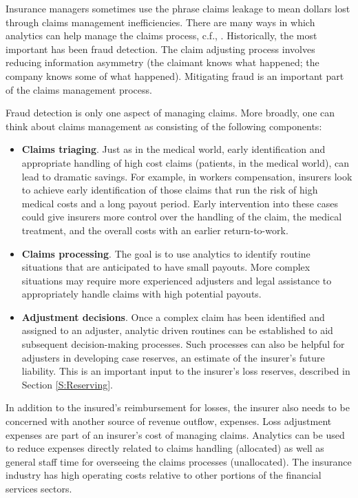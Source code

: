 \documentclass[
]{book}
\providecommand{\tightlist}{%
  \setlength{\itemsep}{0pt}\setlength{\parskip}{0pt}}
\begin{document}
Insurance managers sometimes use the phrase claims leakage to mean dollars lost through claims management inefficiencies. There are many
ways in which analytics can help manage the claims process, c.f., \citet{SASsurvey}. Historically, the most important has been fraud detection.
The claim adjusting process involves reducing information asymmetry (the claimant knows what happened; the company knows some of what happened). Mitigating fraud is an important part of the claims management process.

Fraud detection is only one aspect of managing claims. More broadly, one can think about claims management as consisting of the following components:

\begin{itemize}
\tightlist
\item
  \textbf{Claims triaging}. Just as in the medical world, early identification and appropriate handling of high cost claims (patients, in the medical world), can lead to dramatic savings. For example, in workers compensation, insurers look to achieve early identification of those claims that run the risk of high medical costs and a long payout period. Early intervention into these cases could give insurers more control over the handling of the claim, the medical treatment, and the overall costs with an earlier return-to-work.
\item
  \textbf{Claims processing}. The goal is to use analytics to identify routine situations that are anticipated to have small payouts. More complex situations may require more experienced adjusters and legal assistance to appropriately handle claims with high potential payouts.
\item
  \textbf{Adjustment decisions}. Once a complex claim has been identified and assigned to an adjuster, analytic driven routines can be established to aid subsequent decision-making processes. Such processes can also be helpful for adjusters in developing case reserves, an estimate of the insurer's future liability. This is an important input to the insurer's loss reserves, described in Section \ref{S:Reserving}.
\end{itemize}

In addition to the insured's reimbursement for losses, the insurer also needs to be concerned with another source of revenue outflow, expenses. Loss adjustment expenses are part of an insurer's cost of managing claims. Analytics can be used to reduce expenses directly related to claims handling (allocated) as well as general staff time for overseeing the claims processes (unallocated). The insurance industry has high operating costs relative to other portions of the financial services sectors.
\end{document}
